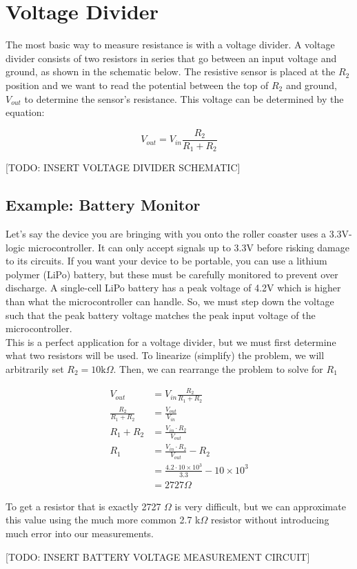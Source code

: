 \chapter{Voltage Divider} \label{chap:voltage_divider}
The most basic way to measure resistance is with a voltage divider.
A voltage divider consists of two resistors in series that go between an input voltage and ground, as shown in the schematic below.
The resistive sensor is placed at the $R_2$ position and we want to read the potential between the top of $R_2$ and ground, $V_{out}$ to determine the sensor's resistance.
This voltage can be determined by the equation:

\begin{equation} \label{eq:voltage_divider}
    V_{out} = V_{in} \frac{R_2}{R_1 + R_2}
\end{equation}

[TODO: INSERT VOLTAGE DIVIDER SCHEMATIC]

\section{Example: Battery Monitor}
    Let's say the device you are bringing with you onto the roller coaster uses a 3.3V-logic microcontroller.
    It can only accept signals up to 3.3V before risking damage to its circuits.
    If you want your device to be portable, you can use a lithium polymer (LiPo) battery, but these must be carefully monitored to prevent over discharge.
    A single-cell LiPo battery has a peak voltage of 4.2V which is higher than what the microcontroller can handle.
    So, we must step down the voltage such that the peak battery voltage matches the peak input voltage of the microcontroller. \\
    
    This is a perfect application for a voltage divider, but we must first determine what two resistors will be used.
    To linearize (simplify) the problem, we will arbitrarily set $R_2 = 10\text{k} \Omega$.
    Then, we can rearrange the problem to solve for $R_1$
    
    \begin{align*}
        V_{out}                 &= V_{in} \frac{R_2}{R_1 + R_2} \\
        \frac{R_2}{R_1 + R_2}   &= \frac{V_{out}}{V_{in}} \\
        R_1 + R_2               &= \frac{V_{in} \cdot R_2}{V_{out}}\\
        R_1                     &= \frac{V_{in} \cdot R_2}{V_{out}} - R_2 \\
                                &= \frac{4.2 \cdot 10\times10^3}{3.3} - 10\times10^3 \\
                                &= 2727 \Omega
    \end{align*}

    To get a resistor that is exactly 2727 $\Omega$ is very difficult, but we can approximate this value using the much more common 2.7 k$\Omega$ resistor without introducing much error into our measurements.

    [TODO: INSERT BATTERY VOLTAGE MEASUREMENT CIRCUIT]
